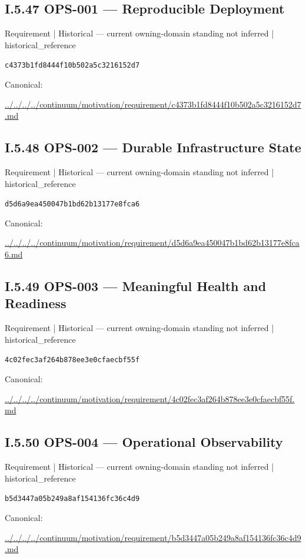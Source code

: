 \documentclass[10pt,a4paper]{article}
\begin{document}
\subsection*{I.5.47 OPS-001 — Reproducible Deployment}
{\small Requirement | Historical — current owning-domain standing not inferred | historical\_reference}\par
\texttt{c4373b1fd8444f10b502a5c3216152d7}\par
Canonical: \par
{\footnotesize\url{../../../../continuum/motivation/requirement/c4373b1fd8444f10b502a5c3216152d7.md}}\par
\subsection*{I.5.48 OPS-002 — Durable Infrastructure State}
{\small Requirement | Historical — current owning-domain standing not inferred | historical\_reference}\par
\texttt{d5d6a9ea450047b1bd62b13177e8fca6}\par
Canonical: \par
{\footnotesize\url{../../../../continuum/motivation/requirement/d5d6a9ea450047b1bd62b13177e8fca6.md}}\par
\subsection*{I.5.49 OPS-003 — Meaningful Health and Readiness}
{\small Requirement | Historical — current owning-domain standing not inferred | historical\_reference}\par
\texttt{4c02fec3af264b878ee3e0cfaecbf55f}\par
Canonical: \par
{\footnotesize\url{../../../../continuum/motivation/requirement/4c02fec3af264b878ee3e0cfaecbf55f.md}}\par
\subsection*{I.5.50 OPS-004 — Operational Observability}
{\small Requirement | Historical — current owning-domain standing not inferred | historical\_reference}\par
\texttt{b5d3447a05b249a8af154136fc36c4d9}\par
Canonical: \par
{\footnotesize\url{../../../../continuum/motivation/requirement/b5d3447a05b249a8af154136fc36c4d9.md}}\par
\end{document}
